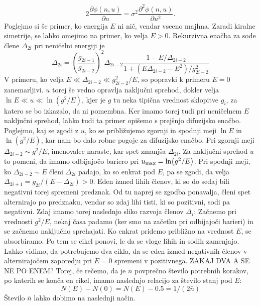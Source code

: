 \begin{equation}
2 \frac{\partial \phi (n,u)}{\partial n} = \sigma^2 \frac{\partial^2 \phi (n,u)}{\partial u^2}.
\end{equation}
Poglejmo si še primer, ko energija $E$ ni nič, vendar vseeno majhna.
Zaradi kiralne simetrije, se lahko omejimo na primer, ko velja $E > 0$.
Rekurzivna enačba za sode člene $\Delta_{2i}$ pri neničelni energiji je
\begin{equation}
\Delta_{2i} = \left(\frac{g_{2i -1}}{g_{2i-2}} \right)^2 \Delta_{2i-2} \frac{1 - E/\Delta_{2i-2}}{1+ (E \Delta_{2i-2} - E^2)/g_{2i-2}^2}
\end{equation}
V primeru, ko velja $E \ll \Delta_{2i-2} \ll g_{2i-2}^2/E$, so popravki k primeru $E=0$ zanemarljivi. $u$ torej še vedno opravlja naključni sprehod, dokler velja
$\ln E \ll u \ll \ln (g^2 / E)$, kjer je $g$ tu neka tipična vrednost sklopitve $g_i$, za katero se bo izkazalo, da ni pomembna. 
Ker imamo torej tudi pri neničelnem $E$ naključni sprehod, lahko tudi ta primer opišemo s prejšnjo difuzijsko enačbo. Poglejmo, kaj se zgodi z $u$, ko se približujemo zgornji in spodnji meji $\ln E$ in $\ln (g^2 / E)$, kar nam bo dalo robne pogoje za difuzijsko enačbo.
Pri zgornji meji $\Delta_{2i-2} \sim g^2/E$, imenovalec naraste, kar spet zmanjša $\Delta_{2i}$. Za naključni sprehod $u$ to pomeni, da imamo
odbijajočo bariero pri $u_{\textup{max}} = \ln (g^2 / E)$.
Pri spodnji meji, ko $\Delta_{2i-2} \sim E$ členi $\Delta_{2i}$ padajo, ko so enkrat pod $E$, pa se zgodi, da velja 
$\Delta_{2i+1} = g_{2i} / (E - \Delta_{2i}) > 0$. Eden izmed lihih členov, ki so do sedaj bili negativni torej spremeni predznak. Od tu naprej se zgodba ponavalja, členi spet alternirajo po predznaku, vendar so zdaj lihi tisti, ki so pozitivni, sodi pa negativni.
Zdaj imamo torej naslednjo sliko razvoja členov $\Delta_i$: Začnemo pri vrednosti $g^2/E$, nekaj časa padamo (ker smo na začetku pri odbijajoči barieri) in se začnemo naključno sprehajati.
Ko enkrat pridemo približno na vrednost $E$, se absorbiramo. Po tem se cikel ponovi, le da se vloge lihih in sodih zamenjajo.
Lahko vidimo, da potrebujemo dva cikla, da se eden izmed negativnih členov v alternirajočem zaporedju pri $E=0$ spremeni v pozitivnega. ZAKAJ DVA A SE NE PO ENEM? Torej, če rečemo, da je $\bar{n}$ povprečno število potrebnih korakov, po katerih se konča en cikel, imamo naslednjo relacijo za število stanj pod $E$:
\begin{equation}
N(E) - N(0) = N(E) - 0.5 = 1/(2\bar{n})
\end{equation}
Število $\bar{n}$ lahko dobimo na naslednji način.

